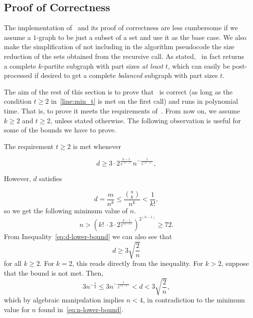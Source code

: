 \subsection{Proof of Correctness} \label{subsec:proof-of-correctness}

The implementation of~ and its proof of correctness are less cumbersome if we assume
a $1$-graph to be just a subset of a set and use it as the base case.
We also make the simplification of not including in the algorithm pseudocode
the size reduction of the sets obtained from the recursive call.
As stated,~ in fact returns a complete $k$-partite
subgraph with part sizes \emph{at least} $t$, which can easily be post-processed
if desired to get a complete \emph{balanced} subgraph with part sizes $t$.

The aim of the rest of this section is to prove that~ is correct
(as long as the  condition $t \geq 2$ in~\cref{line:min_t} is met on the first call)
and runs in polynomial time.
That is, to prove it meets the requirements of~.
From now on, we assume $k \geq 2$ and
$t \geq 2$, unless stated otherwise.
The following observation is useful for some of the bounds we have to prove.

\begin{remark}\label{rm:min_d}
    The requirement $t \geq 2$ is met whenever

    \begin{equation} \label{eq:d-lower-bound}
        d \geq 3 \cdot 2^{\frac{k - 1}{2^{(k-1)}}} n^{-\frac{1}{2^{(k-1)}}},
    \end{equation}

    However, $d$ satisfies

    \begin{equation} \label{eq:d-upper-bound}
        d = \frac{m}{n^k} \leq \frac{\binom{n}{k}}{n^k} < \frac{1}{k!},
    \end{equation}
    so we get the following minimum value of $n$.
    \begin{equation} \label{eq:n-lower-bound}
        n > \left( k!\, \cdot 3 \cdot 2^{\frac{k-1}{2^{(k-1)}}} \right)^{2^{(k-1)}} \geq 72.
    \end{equation}
    From Inequality~\eqref{eq:d-lower-bound} we can also see that
    \begin{equation} \label{eq:d-lower-bound-2}
        d \geq 3 \sqrt{\frac{2}{n}}
    \end{equation}
    for all $k \geq 2$.
    For $k=2$, this reads directly from the inequality.
    For $k > 2$, suppose that the bound is not met.
    Then,
    \[
        3 n^{-\frac{1}{4}} \leq 3 n^{-\frac{1}{2^{(k-1)}}} < d < 3 \sqrt{\frac{2}{n}},
    \]
    which by algebraic manipulation implies $n < 4$,
    in contradiction to the minimum value for $n$ found in~\eqref{eq:n-lower-bound}.
\end{remark}

